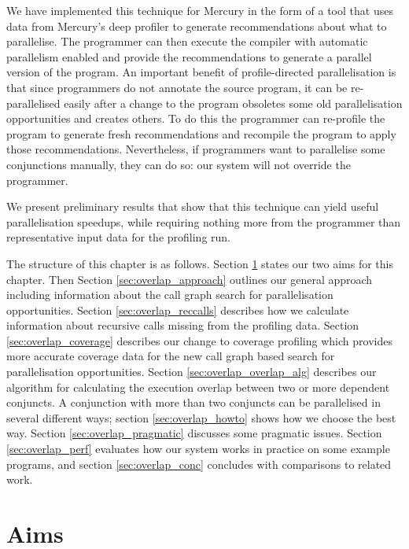 We have implemented this technique for Mercury
in the form of a tool
that uses data from Mercury's deep profiler
to generate recommendations about what to parallelise.
The programmer can then execute the compiler with automatic parallelism
enabled and provide the recommendations to generate a parallel version of
the program.
An important benefit of profile-directed parallelisation is that
since programmers do not annotate the source program,
it can be re-parallelised easily after a change to the program
obsoletes some old parallelisation opportunities and creates others.
To do this the programmer can re-profile the program to generate fresh
recommendations and recompile the program to apply those recommendations.
Nevertheless, if programmers want to parallelise some conjunctions manually,
they can do so: our system will not override the programmer.

We present preliminary results that show that
this technique can yield useful parallelisation speedups,
while requiring nothing more from the programmer
than representative input data for the profiling run.

The structure of this chapter is as follows.
Section \ref{sec:overlap_aims} states our two aims for this chapter.
Then Section \ref{sec:overlap_approach} outlines our general approach
including information about the call graph search for parallelisation
opportunities.
Section \ref{sec:overlap_reccalls}
describes how we calculate information about recursive calls missing from
the profiling data.
Section \ref{sec:overlap_coverage}
describes our change to coverage profiling which provides more accurate
coverage data for the new call graph based search for parallelisation
opportunities.
Section \ref{sec:overlap_overlap_alg} describes our algorithm for
calculating the execution overlap between two or more dependent conjuncts.
A conjunction with more than two conjuncts can be parallelised
in several different ways;
section \ref{sec:overlap_howto} shows how we choose the best way.
Section \ref{sec:overlap_pragmatic} discusses some pragmatic issues.
Section \ref{sec:overlap_perf} evaluates
how our system works in practice on some example programs, and
section \ref{sec:overlap_conc} concludes
with comparisons to related work.

\section{Aims}
\label{sec:overlap_aims}


